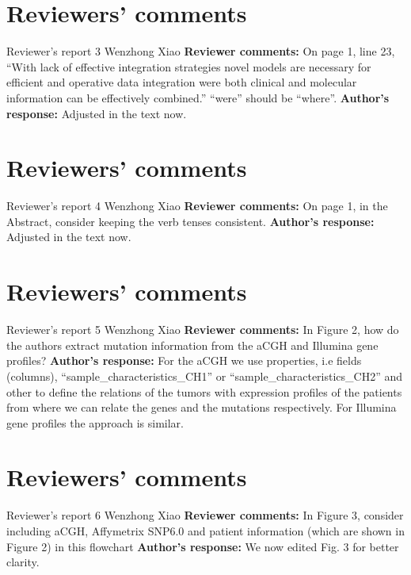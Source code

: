\documentclass{bmcart}
\begin{document}
\begin{backmatter}
\section*{Reviewers' comments}
\newline Reviewer's report 3
\newline Wenzhong Xiao
\newline \textbf{Reviewer comments:}
On page 1, line 23, “With lack of effective integration strategies novel models are necessary for efficient and operative data integration were both clinical and molecular information can be effectively combined.” “were” should be “where”.
\newline \textbf{Author's response:}
Adjusted in the text now.

\section*{Reviewers' comments}
\newline Reviewer's report 4
\newline Wenzhong Xiao
\newline \textbf{Reviewer comments:}
On page 1, in the Abstract, consider keeping the verb tenses consistent.
\newline \textbf{Author's response:}
Adjusted in the text now.

\section*{Reviewers' comments}
\newline Reviewer's report 5
\newline Wenzhong Xiao
\newline \textbf{Reviewer comments:}
 In Figure 2, how do the authors extract mutation information from the aCGH and Illumina gene profiles? 
\newline \textbf{Author's response:}
For the aCGH we use properties, i.e fields (columns), “sample_characteristics_CH1” or “sample_characteristics_CH2” and other to define the relations of the tumors with expression profiles of the patients from where we can relate the genes and the mutations respectively. For Illumina gene profiles the approach is similar.

\section*{Reviewers' comments}
\newline Reviewer's report 6
\newline Wenzhong Xiao
\newline \textbf{Reviewer comments:}
In Figure 3, consider including aCGH, Affymetrix SNP6.0 and patient information (which are shown in Figure 2) in this flowchart
\newline \textbf{Author's response:}
We now edited Fig. 3 for better clarity.



\end{backmatter}
\end{document}
